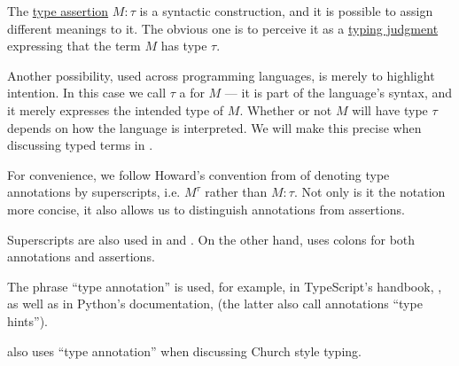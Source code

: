 \begin{concept}\label{con:type_annotation}
  The \hyperref[def:type_assertion]{type assertion} \( M: \tau \) is a syntactic construction, and it is possible to assign different meanings to it. The obvious one is to perceive it as a \hyperref[rem:typing_judgments]{typing judgment} expressing that the term \( M \) has type \( \tau \).

  Another possibility, used across programming languages, is merely to highlight intention. In this case we call \( \tau \) a  for \( M \) --- it is part of the language's syntax, and it merely expresses the intended type of \( M \). Whether or not \( M \) will have type \( \tau \) depends on how the language is interpreted. We will make this precise when discussing typed terms in .

  For convenience, we follow Howard's convention from \cite{Howard1980FormulasAsTypes} of denoting type annotations by superscripts, i.e. \( M^\tau \) rather than \( M: \tau \). Not only is it the notation more concise, it also allows us to distinguish annotations from assertions.
\end{concept}
\begin{comments}
  \item Superscripts are also used in \cite{Mimram2020ProgramEqualsProof} and \cite[ch. 5]{Hindley1997BasicSTT}. On the other hand,  uses colons for both annotations and assertions.

  \item The phrase \enquote{type annotation} is used, for example, in TypeScript's handbook, \cite{TypeScriptDocs:5.7:handbook}, as well as in Python's documentation, \cite{PythonDocs:3.13:typing} (the latter also call annotations \enquote{type hints}).

   also uses \enquote{type annotation} when discussing Church style typing.
\end{comments}

